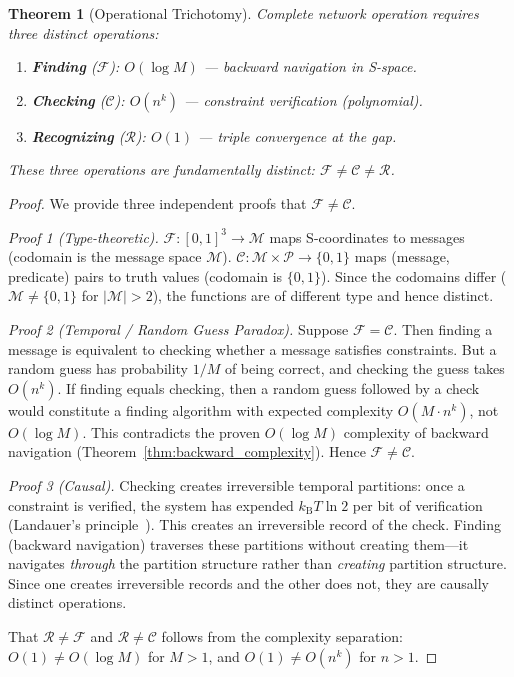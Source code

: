 \documentclass[11pt,twocolumn,a4paper]{article}
\newtheorem{theorem}{Theorem}[section]
\theoremstyle{definition}
\newcommand{\kB}{k_{\mathrm{B}}}
\begin{document}
\begin{theorem}[Operational Trichotomy]\label{thm:trichotomy}
Complete network operation requires three distinct operations:
\begin{enumerate}[label=(\roman*)]
  \item \textbf{Finding} ($\mathcal{F}$): $O(\log M)$ --- backward navigation in S-space.
  \item \textbf{Checking} ($\mathcal{C}$): $O(n^k)$ --- constraint verification (polynomial).
  \item \textbf{Recognizing} ($\mathcal{R}$): $O(1)$ --- triple convergence at the gap.
\end{enumerate}
These three operations are fundamentally distinct: $\mathcal{F} \neq \mathcal{C} \neq \mathcal{R}$.
\end{theorem}

\begin{proof}
We provide three independent proofs that $\mathcal{F} \neq \mathcal{C}$.

\emph{Proof 1 (Type-theoretic).}
$\mathcal{F}: [0,1]^3 \to \mathcal{M}$ maps S-coordinates to messages (codomain is the
message space $\mathcal{M}$). $\mathcal{C}: \mathcal{M} \times \mathcal{P} \to \{0,1\}$
maps (message, predicate) pairs to truth values (codomain is $\{0,1\}$). Since the
codomains differ ($\mathcal{M} \neq \{0,1\}$ for $|\mathcal{M}| > 2$), the functions
are of different type and hence distinct.

\emph{Proof 2 (Temporal / Random Guess Paradox).}
Suppose $\mathcal{F} = \mathcal{C}$. Then finding a message is equivalent to checking
whether a message satisfies constraints. But a random guess has probability $1/M$ of being
correct, and checking the guess takes $O(n^k)$. If finding equals checking, then a random
guess followed by a check would constitute a finding algorithm with expected complexity
$O(M \cdot n^k)$, not $O(\log M)$. This contradicts the proven $O(\log M)$ complexity
of backward navigation (Theorem~\ref{thm:backward_complexity}). Hence
$\mathcal{F} \neq \mathcal{C}$.

\emph{Proof 3 (Causal).}
Checking creates irreversible temporal partitions: once a constraint is verified, the
system has expended $\kB T \ln 2$ per bit of verification (Landauer's
principle~\cite{landauer1961}). This creates an irreversible record of the check.
Finding (backward navigation) traverses these partitions without creating them---it
navigates \emph{through} the partition structure rather than \emph{creating} partition
structure. Since one creates irreversible records and the other does not, they are
causally distinct operations.

That $\mathcal{R} \neq \mathcal{F}$ and $\mathcal{R} \neq \mathcal{C}$ follows from
the complexity separation: $O(1) \neq O(\log M)$ for $M > 1$, and $O(1) \neq O(n^k)$
for $n > 1$.
\end{proof}
\end{document}
